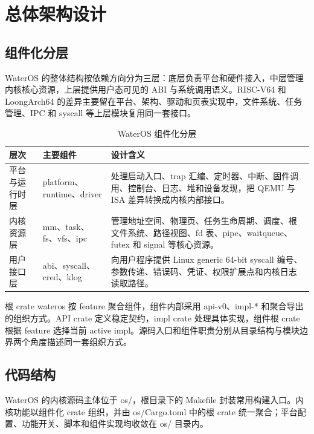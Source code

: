 \documentclass[12pt,openany,oneside,AutoFakeBold=true]{ctexbook}
\newcommand{\code}[1]{\textnormal{\rmfamily #1}}
\begin{document}
\chapter{总体架构设计}


\section{组件化分层}

WaterOS 的整体结构按依赖方向分为三层：底层负责平台和硬件接入，中层管理内核核心资源，上层提供用户态可见的 ABI 与系统调用语义。RISC-V64 和 LoongArch64 的差异主要留在平台、架构、驱动和页表实现中，文件系统、任务管理、IPC 和 syscall 等上层模块复用同一套接口。

\begin{longtable}{>{\raggedright\arraybackslash}p{3.0cm}>{\raggedright\arraybackslash}p{4.7cm}>{\raggedright\arraybackslash}p{5.8cm}}
  \caption{WaterOS 组件化分层}\label{tab:component-layers}\\
  \toprule[1.5pt]
  层次 & 主要组件 & 设计含义 \\
  \midrule[1pt]
  平台与运行时层 & platform、runtime、driver & 处理启动入口、trap 汇编、定时器、中断、固件调用、控制台、日志、堆和设备发现，把 QEMU 与 ISA 差异转换成内核内部接口。 \\
  内核资源层 & mm、task、fs、vfs、ipc & 管理地址空间、物理页、任务生命周期、调度、根文件系统、路径视图、fd 表、pipe、waitqueue、futex 和 signal 等核心资源。 \\
  用户接口层 & abi、syscall、cred、klog & 向用户程序提供 Linux generic 64-bit syscall 编号、参数传递、错误码、凭证、权限扩展点和内核日志读取路径。 \\
  \bottomrule[1.5pt]
\end{longtable}

根 crate \code{wateros} 按 feature 聚合组件，组件内部采用 \code{api-v0}、\code{impl-*} 和聚合导出的组织方式。API crate 定义稳定契约，impl crate 处理具体实现，组件根 crate 根据 feature 选择当前 active impl。源码入口和组件职责分别从目录结构与模块边界两个角度描述同一套组织方式。

\section{代码结构}

WaterOS 的内核源码主体位于 \code{os/}，根目录下的 \code{Makefile} 封装常用构建入口。内核功能以组件化 crate 组织，并由 \code{os/Cargo.toml} 中的根 crate 统一聚合；平台配置、功能开关、脚本和组件实现均收敛在 \code{os/} 目录内。
\end{document}
